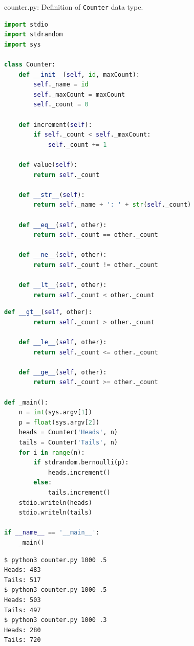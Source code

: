 \documentclass[8pt,a4paper,compress]{beamer}
\begin{document}
\begin{frame}[fragile]
\pause

\begin{framed}
\tiny counter.py: Definition of \lstinline{Counter} data type.
\end{framed}

\begin{lstlisting}[language=Python,style=focusin]
import stdio
import stdrandom
import sys

class Counter:
    def __init__(self, id, maxCount):
        self._name = id
        self._maxCount = maxCount
        self._count = 0

    def increment(self):
        if self._count < self._maxCount:
            self._count += 1

    def value(self):
        return self._count

    def __str__(self):
        return self._name + ': ' + str(self._count)

    def __eq__(self, other):
        return self._count == other._count

    def __ne__(self, other):
        return self._count != other._count

    def __lt__(self, other):
        return self._count < other._count
\end{lstlisting}
\end{frame}

\begin{frame}[fragile]
\pause

\begin{lstlisting}[language=Python,style=focusin]
    def __gt__(self, other):
        return self._count > other._count

    def __le__(self, other):
        return self._count <= other._count

    def __ge__(self, other):
        return self._count >= other._count

def _main():
    n = int(sys.argv[1])
    p = float(sys.argv[2])
    heads = Counter('Heads', n)
    tails = Counter('Tails', n)
    for i in range(n):
        if stdrandom.bernoulli(p):
            heads.increment()
        else:
            tails.increment()
    stdio.writeln(heads)
    stdio.writeln(tails)

if __name__ == '__main__':
    _main()
\end{lstlisting}

\pause
\bigskip

\begin{lstlisting}[language={},style=focusin]
$ python3 counter.py 1000 .5
Heads: 483
Tails: 517
$ python3 counter.py 1000 .5
Heads: 503
Tails: 497
$ python3 counter.py 1000 .3
Heads: 280
Tails: 720
\end{lstlisting}
\end{frame}
\end{document}
